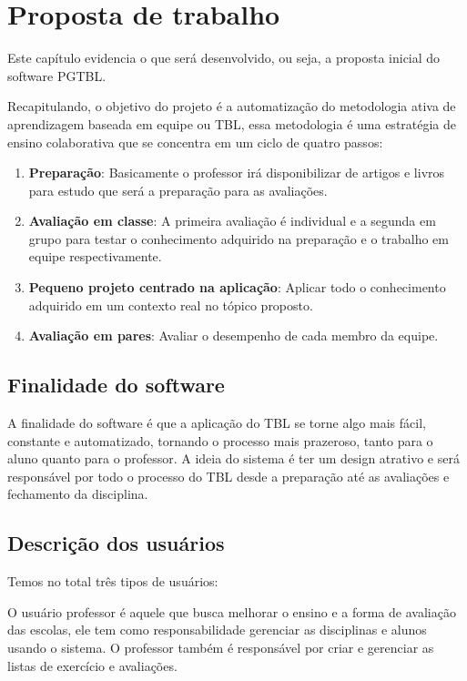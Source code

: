 \chapter{Proposta de trabalho}

Este capítulo evidencia o que será desenvolvido, ou seja, a proposta inicial do software PGTBL.

Recapitulando, o objetivo do projeto é a automatização do metodologia ativa de aprendizagem baseada em equipe ou TBL, essa metodologia é uma estratégia de ensino colaborativa que se concentra em um ciclo de quatro passos:

\begin{enumerate}
  \item \textbf{Preparação}: Basicamente o professor irá disponibilizar de artigos e livros para estudo que será a preparação para as avaliações.
  \item \textbf{Avaliação em classe}: A primeira avaliação é individual e a segunda em grupo para testar o conhecimento adquirido na preparação e o trabalho em equipe respectivamente.
  \item \textbf{Pequeno projeto centrado na aplicação}: Aplicar todo o conhecimento adquirido em um contexto real no tópico proposto.
  \item \textbf{Avaliação em pares}: Avaliar o desempenho de cada membro da equipe.
\end{enumerate}

\section{Finalidade do software}

A finalidade do software é que a aplicação do TBL se torne algo mais fácil, constante e automatizado, tornando o processo mais prazeroso, tanto para o aluno quanto para o professor. A ideia do sistema é ter um design atrativo e será responsável por todo o processo do TBL desde a preparação até as avaliações e fechamento da disciplina.

\section{Descrição dos usuários}

Temos no total três tipos de usuários:

O usuário professor é aquele que busca melhorar o ensino e a forma de avaliação das escolas, ele tem como responsabilidade gerenciar as disciplinas e alunos usando o sistema. O professor também é responsável por criar e gerenciar as listas de exercício e avaliações.

